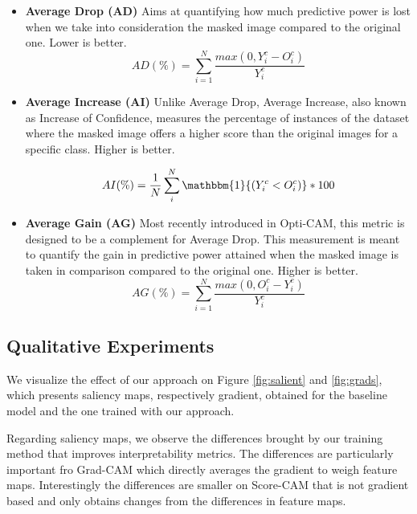 \begin{itemize}
	\item \textbf{Average Drop (AD)} 
	Aims at quantifying how much predictive power is lost when we take into consideration the masked image compared to the original one. Lower is better.
	\begin{equation}
	AD(\%) = \sum_{i=1}^N \frac{max(0,Y_i^c- O_i^c)}{Y_i^c}
	\end{equation}
	\label{Average Drop}
	
	\item \textbf{Average Increase (AI)}
	Unlike Average Drop, Average Increase, also known as Increase of Confidence, measures the percentage of instances of the dataset where the masked image offers a higher score than the original images for a specific class. Higher is better.
	
	\begin{equation}
	AI(\%) = \frac{1}{N} \sum_i^N \mathbbm{1}{(Y_i^c<O_i^c)}*100
	\end{equation}
	
	\item \textbf{Average Gain (AG)} 
	Most recently introduced in Opti-CAM, %
	this metric is designed to be a complement for Average Drop. This measurement is meant to quantify the gain in predictive power attained when the masked image is taken in comparison compared to the original one.
	Higher is better.
	\begin{equation}
	AG(\%) = \sum_{i=1}^N \frac{max(0, O_i^c-Y_i^c)}{Y_i^c}
	\end{equation}
\end{itemize}


\subsection{Qualitative Experiments}
We visualize the effect of our approach on Figure \ref{fig:salient} and \ref{fig:grads}, which  presents saliency maps, respectively gradient, obtained for the baseline model and the one trained with our approach.

Regarding saliency maps, we observe the differences brought by our training method that improves interpretability metrics.
The differences are particularly important fro Grad-CAM which directly averages the gradient to weigh feature maps.
Interestingly the differences are smaller on Score-CAM that is not gradient based and only obtains changes from the differences in feature maps.

